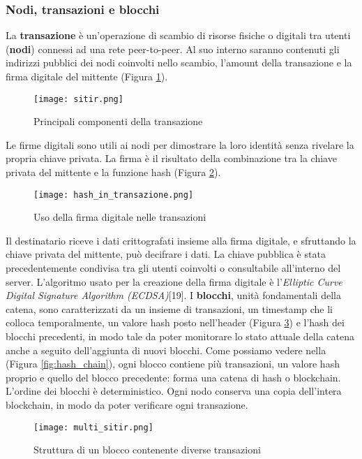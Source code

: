 \subsubsection{Nodi, transazioni e blocchi}
La \textbf{transazione} è un'operazione di scambio di risorse fisiche o digitali tra utenti (\textbf{nodi}) connessi ad una rete peer-to-peer. Al suo interno saranno contenuti gli indirizzi pubblici dei nodi coinvolti nello scambio, l'amount della transazione e la firma digitale del mittente (Figura \ref{fig:sitir}).

\begin{figure}[htbp]
  \centering
  \texttt{[image: sitir.png]}
  \caption{Principali componenti della transazione}
  \label{fig:sitir}
\end{figure}

Le firme digitali sono utili ai nodi per dimostrare la loro identità senza rivelare la propria chiave privata. La firma è il risultato della combinazione tra la chiave privata del mittente e la funzione hash (Figura \ref{fig:hash_in_transazione}).

\begin{figure}[htbp]
  \centering
  \texttt{[image: hash\_in\_transazione.png]}
  \caption{Uso della firma digitale nelle transazioni}
  \label{fig:hash_in_transazione}
\end{figure}

Il destinatario riceve i dati crittografati insieme alla firma digitale, e sfruttando la chiave privata del mittente, può decifrare i dati. La chiave pubblica è stata precedentemente condivisa tra gli utenti coinvolti o consultabile all'interno del server. L'algoritmo usato per la creazione della firma digitale è l'\textit{Elliptic Curve Digital Signature Algorithm (ECDSA)}[19].
I \textbf{blocchi}, unità fondamentali della catena, sono caratterizzati da un insieme di transazioni, un timestamp che li colloca temporalmente, un valore hash posto nell'header (Figura \ref{fig:multi_sitir}) e l'hash dei blocchi precedenti, in modo tale da poter monitorare lo stato attuale della catena anche a seguito dell'aggiunta di nuovi blocchi. Come possiamo vedere nella (Figura \ref{fig:hash_chain}), ogni blocco contiene più transazioni, un valore hash proprio e quello del blocco precedente: forma una catena di hash o blockchain. L'ordine dei blocchi è deterministico. Ogni nodo conserva una copia dell'intera blockchain, in modo da poter verificare ogni transazione.

\begin{figure}[htbp]
  \centering
  \texttt{[image: multi\_sitir.png]}
  \caption{Struttura di un blocco contenente diverse transazioni}
  \label{fig:multi_sitir}
\end{figure}

